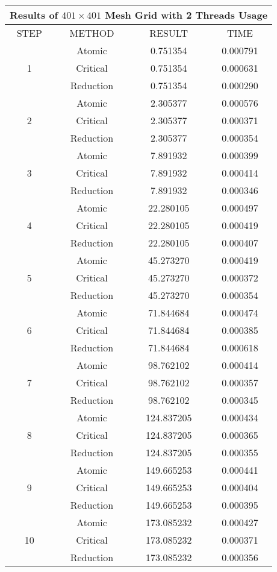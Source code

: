 \documentclass[10pt]{article}
\begin{document}
\begin{center}
\begin{tabular}{|c|c|c|c|}
\hline
\multicolumn{4}{|c|}{Results of $401 \times 401$ Mesh Grid with 2 Threads Usage} \\
\hline
STEP & METHOD & RESULT & TIME \\
\hline
\multirow[t]{3}{*}{1} & Atomic & 0.751354 & 0.000791 \\
\hline
 & Critical & 0.751354 & 0.000631 \\
\hline
 & Reduction & 0.751354 & 0.000290 \\
\hline
\multirow[t]{3}{*}{2} & Atomic & 2.305377 & 0.000576 \\
\hline
 & Critical & 2.305377 & 0.000371 \\
\hline
 & Reduction & 2.305377 & 0.000354 \\
\hline
\multirow[t]{3}{*}{3} & Atomic & 7.891932 & 0.000399 \\
\hline
 & Critical & 7.891932 & 0.000414 \\
\hline
 & Reduction & 7.891932 & 0.000346 \\
\hline
\multirow[t]{3}{*}{4} & Atomic & 22.280105 & 0.000497 \\
\hline
 & Critical & 22.280105 & 0.000419 \\
\hline
 & Reduction & 22.280105 & 0.000407 \\
\hline
\multirow[t]{3}{*}{5} & Atomic & 45.273270 & 0.000419 \\
\hline
 & Critical & 45.273270 & 0.000372 \\
\hline
 & Reduction & 45.273270 & 0.000354 \\
\hline
\multirow[t]{3}{*}{6} & Atomic & 71.844684 & 0.000474 \\
\hline
 & Critical & 71.844684 & 0.000385 \\
\hline
 & Reduction & 71.844684 & 0.000618 \\
\hline
\multirow[t]{3}{*}{7} & Atomic & 98.762102 & 0.000414 \\
\hline
 & Critical & 98.762102 & 0.000357 \\
\hline
 & Reduction & 98.762102 & 0.000345 \\
\hline
\multirow[t]{3}{*}{8} & Atomic & 124.837205 & 0.000434 \\
\hline
 & Critical & 124.837205 & 0.000365 \\
\hline
 & Reduction & 124.837205 & 0.000355 \\
\hline
\multirow[t]{3}{*}{9} & Atomic & 149.665253 & 0.000441 \\
\hline
 & Critical & 149.665253 & 0.000404 \\
\hline
 & Reduction & 149.665253 & 0.000395 \\
\hline
\multirow[t]{3}{*}{10} & Atomic & 173.085232 & 0.000427 \\
\hline
 & Critical & 173.085232 & 0.000371 \\
\hline
 & Reduction & 173.085232 & 0.000356 \\
\hline
\end{tabular}
\end{center}
\end{document}
